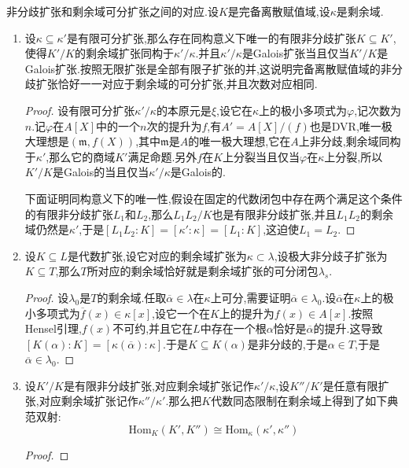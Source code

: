 非分歧扩张和剩余域可分扩张之间的对应.设$K$是完备离散赋值域,设$\kappa$是剩余域.
\begin{enumerate}
	\item 设$\kappa\subseteq\kappa'$是有限可分扩张,那么存在同构意义下唯一的有限非分歧扩张$K\subseteq K'$,使得$K'/K$的剩余域扩张同构于$\kappa'/\kappa$.并且$\kappa'/\kappa$是Galois扩张当且仅当$K'/K$是Galois扩张.按照无限扩张是全部有限子扩张的并,这说明完备离散赋值域的非分歧扩张恰好一一对应于剩余域的可分扩张,并且次数对应相同.
	\begin{proof}
		
		设有限可分扩张$\kappa'/\kappa$的本原元是$\xi$,设它在$\kappa$上的极小多项式为$\varphi$,记次数为$n$.记$\varphi$在$A[X]$中的一个$n$次的提升为$f$,有$A'=A[X]/(f)$也是DVR,唯一极大理想是$(\mathfrak{m},f(X))$,其中$\mathfrak{m}$是$A$的唯一极大理想,它在$A$上非分歧,剩余域同构于$\kappa'$,那么它的商域$K'$满足命题.另外$f$在$K$上分裂当且仅当$\varphi$在$\kappa$上分裂,所以$K'/K$是Galois的当且仅当$\kappa'/\kappa$是Galois的.
		
		\qquad
		
		下面证明同构意义下的唯一性,假设在固定的代数闭包中存在两个满足这个条件的有限非分歧扩张$L_1$和$L_2$,那么$L_1L_2/K$也是有限非分歧扩张,并且$L_1L_2$的剩余域仍然是$\kappa'$,于是$[L_1L_2:K]=[\kappa':\kappa]=[L_1:K]$,这迫使$L_1=L_2$.
	\end{proof}
    \item 设$K\subseteq L$是代数扩张,设它对应的剩余域扩张为$\kappa\subset\lambda$,设极大非分歧子扩张为$K\subseteq T$,那么$T$所对应的剩余域恰好就是剩余域扩张的可分闭包$\lambda_s$.
    \begin{proof}
    	
    	设$\lambda_0$是$T$的剩余域.任取$\overline{\alpha}\in\lambda$在$\kappa$上可分,需要证明$\overline{\alpha}\in\lambda_0$.设$\overline{\alpha}$在$\kappa$上的极小多项式为$\overline{f}(x)\in\kappa[x]$,设它一个在$K$上的提升为$f(x)\in A[x]$.按照Hensel引理,$f(x)$不可约,并且它在$L$中存在一个根$\alpha$恰好是$\overline{\alpha}$的提升.这导致$[K(\alpha):K]=[\kappa(\overline{\alpha}):\kappa]$.于是$K\subseteq K(\alpha)$是非分歧的,于是$\alpha\in T$,于是$\overline{\alpha}\in\lambda_0$.
    \end{proof}
    \item 设$K'/K$是有限非分歧扩张,对应剩余域扩张记作$\kappa'/\kappa$,设$K''/K'$是任意有限扩张,对应剩余域扩张记作$\kappa''/\kappa'$.那么把$K$代数同态限制在剩余域上得到了如下典范双射:
    $$\mathrm{Hom}_K(K',K'')\cong\mathrm{Hom}_{\kappa}(\kappa',\kappa'')$$
    \begin{proof}
    	

\end{proof}
\end{enumerate}
